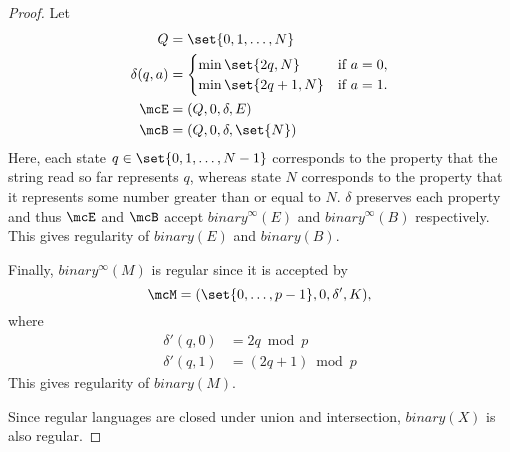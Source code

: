 \documentclass[12pt]{article}
\begin{document}
\begin{proof}
    Let
    \begin{align*}
        Q &= \set{0, 1, \ldots, N} \\
        \delta(q, a) &= \begin{cases}
            \min\set{2q, N} & \text{if } a = 0, \\
            \min\set{2q + 1, N} & \text{if } a = 1.
        \end{cases} \\
        \mcE &= (Q, 0, \delta, E) \\
        \mcB &= (Q, 0, \delta, \set{N})
    \end{align*}
    Here, each state $q \in \set{0, 1, \dots, N-1}$ corresponds to the
    property that the string read so far represents $q$, whereas state $N$
    corresponds to the property that it represents some number greater than
    or equal to $N$.
    $\delta$ preserves each property and thus $\mcE$ and $\mcB$ accept
    $binary^\infty(E)$ and $binary^\infty(B)$ respectively.
    This gives regularity of $binary(E)$ and $binary(B)$.

    Finally, $binary^\infty(M)$ is regular since it is accepted by \[
        \mcM = (\set{0, \dots, p-1}, 0, \delta', K),
    \] where
    \begin{align*}
        \delta'(q, 0) &= 2q \bmod p \\
        \delta'(q, 1) &= (2q + 1) \bmod p
    \end{align*}
    This gives regularity of $binary(M)$.

    Since regular languages are closed under union and intersection,
    $binary(X)$ is also regular.
\end{proof}
\end{document}
